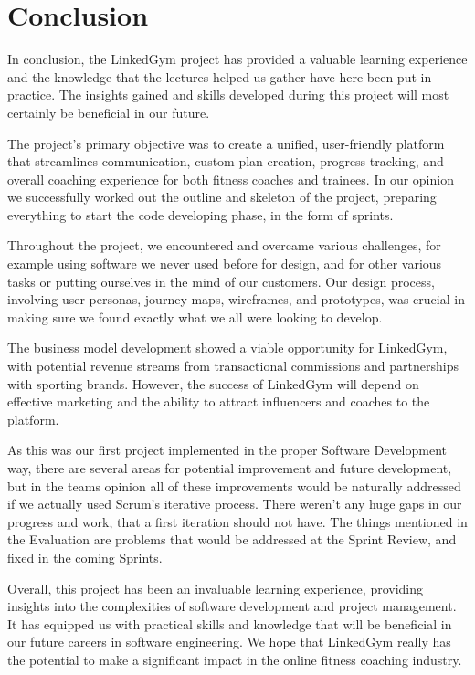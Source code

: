 \section{Conclusion}

In conclusion, the LinkedGym project has provided a valuable learning experience and the knowledge that the lectures helped us gather have here been put in practice. The insights gained and skills developed during this project will most certainly be beneficial in our future.

The project's primary objective was to create a unified, user-friendly platform that streamlines communication, custom plan creation, progress tracking, and overall coaching experience for both fitness coaches and trainees. In our opinion we successfully worked out the outline and skeleton of the project, preparing everything to start the code developing phase, in the form of sprints.

Throughout the project, we encountered and overcame various challenges, for example using software we never used before for design, and for other various tasks or putting ourselves in the mind of our customers. Our design process, involving user personas, journey maps, wireframes, and prototypes, was crucial in making sure we found exactly what we all were looking to develop.

The business model development showed a viable opportunity for LinkedGym, with potential revenue streams from transactional commissions and partnerships with sporting brands. However, the success of LinkedGym will depend on effective marketing and the ability to attract influencers and coaches to the platform.

As this was our first project implemented in the proper Software Development way, there are several areas for potential improvement and future development, but in the teams opinion all of these improvements would be naturally addressed if we actually used Scrum's iterative process. There weren't any huge gaps in our progress and work, that a first iteration should not have. The things mentioned in the Evaluation are problems that would be addressed at the Sprint Review, and fixed in the coming Sprints. 

Overall, this project has been an invaluable learning experience, providing insights into the complexities of software development and project management. It has equipped us with practical skills and knowledge that will be beneficial in our future careers in software engineering. We hope that LinkedGym really has the potential to make a significant impact in the online fitness coaching industry.
\clearpage